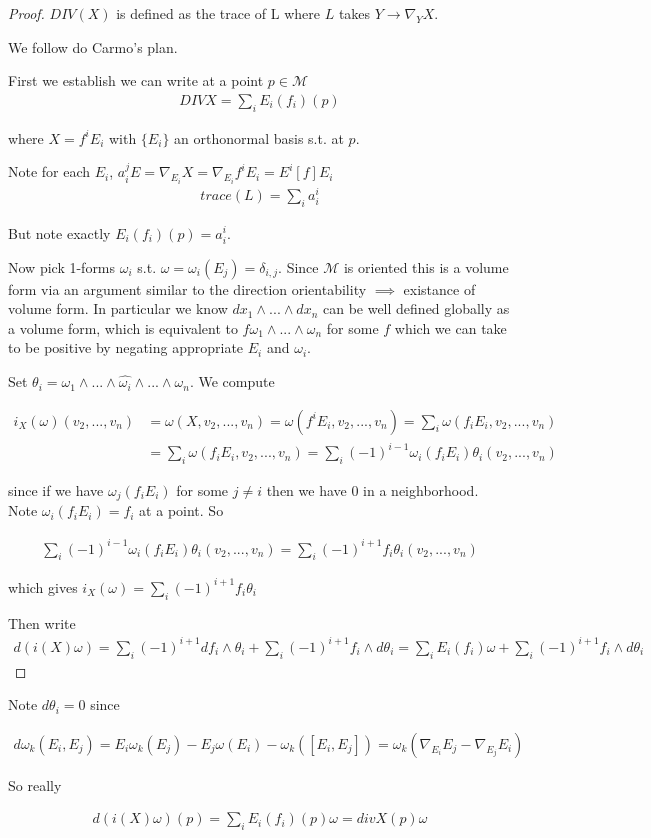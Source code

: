 \documentclass[11pt]{article}
\newcommand{\m}{\mathcal{M}}
\begin{document}
\begin{proof}

	$DIV(X)$ is defined as the trace of L where $L$ takes $Y \to \nabla_Y X$. 

	We follow do Carmo's plan. 


	First we establish we can write at a point $p \in \m$
	\begin{align*}
		DIV X = \sum_i E_i(f_i)(p)
	\end{align*}

	where $X = f^i E_i$ with $\{E_i\}$ an orthonormal basis s.t. at $p$.

	Note for each $E_i$, $a_i^j E = \nabla_{E_i} X = \nabla_{E_i} f^i E_i = E^i[f] E_i  $
	\begin{align*}
		trace(L) = \sum_i a_i^i
	\end{align*}

	But note exactly $E_i(f_i)(p) = a_i^i$. 

	Now pick 1-forms $\omega_i$ s.t. $\omega = \omega_i(E_j) = \delta_{i,j}$. Since $\m$ is oriented this is a volume form via an argument similar to the direction orientability $\implies$ existance of volume form. In particular we know $dx_1 \wedge ... \wedge dx_n$ can be well defined globally as a volume form, which is equivalent to $f\omega_1 \wedge ... \wedge \omega_n$ for some $f$ which we can take to be positive by negating appropriate $E_i$ and $\omega_i$. 

	Set $\theta_i = \omega_1 \wedge ... \wedge \hat{\omega_i} \wedge ... \wedge \omega_n$. We compute

	\begin{align*}
		i_X(\omega)(v_2,...,v_n) &= \omega(X,v_2,...,v_n) = \omega(f^iE_i,v_2,...,v_n) = \sum_i \omega(f_iE_i,v_2,...,v_n) \\
		&=\sum_i \omega(f_iE_i,v_2,...,v_n) = \sum_i (-1)^{i-1}\omega_i(f_iE_i) \theta_i(v_2,...,v_n)
	\end{align*}

	since if we have $\omega_j(f_iE_i)$ for some $j \neq i$ then we have 0 in a neighborhood. Note $\omega_i(f_i E_i) = f_i$ at a point. So

	\begin{align*}
		\sum_i (-1)^{i-1}\omega_i(f_iE_i) \theta_i(v_2,...,v_n) = \sum_i (-1)^{i+1}f_i \theta_i(v_2,...,v_n)
	\end{align*}

	which gives $i_X(\omega) = \sum_i (-1)^{i+1} f_i \theta_i$

	Then write
	\begin{align*}
		d(i(X)\omega) = \sum_i (-1)^{i+1} df_i \wedge \theta_i + \sum_i (-1)^{i+1} f_i \wedge d\theta_i = \sum_i E_i(f_i) \omega + \sum_i (-1)^{i+1}f_i \wedge d\theta_i
	\end{align*}
\end{proof}

Note $d \theta_i = 0$ since

\begin{align*}
	d\omega_k (E_i,E_j) = E_i \omega_k(E_j) - E_j \omega(E_i) - \omega_k([E_i,E_j]) = \omega_k (\nabla_{E_i} E_j - \nabla_{E_j} E_i)
\end{align*}

So really 

\begin{align*}
	d(i(X)\omega)(p) = \sum_i E_i(f_i)(p) \omega = div X(p) \omega
\end{align*}
\end{document}
